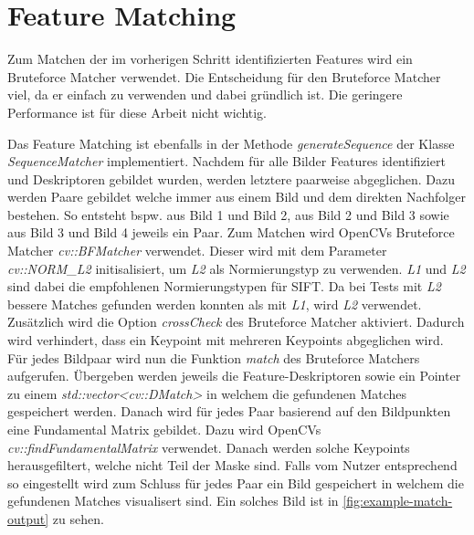 \section{Feature Matching}
Zum Matchen der im vorherigen Schritt identifizierten Features wird ein Bruteforce Matcher verwendet.
Die Entscheidung für den Bruteforce Matcher viel, da er einfach zu verwenden und dabei gründlich ist.
Die geringere Performance ist für diese Arbeit nicht wichtig.

Das Feature Matching ist ebenfalls in der Methode \emph{generateSequence} der Klasse \emph{SequenceMatcher} implementiert.
Nachdem für alle Bilder Features identifiziert und Deskriptoren gebildet wurden, werden letztere paarweise abgeglichen.
Dazu werden Paare gebildet welche immer aus einem Bild und dem direkten Nachfolger bestehen.
So entsteht bspw. aus Bild 1 und Bild 2, aus Bild 2 und Bild 3 sowie aus Bild 3 und Bild 4 jeweils ein Paar.
Zum Matchen wird OpenCVs Bruteforce Matcher \emph{cv::BFMatcher} verwendet.
Dieser wird mit dem Parameter \emph{cv::NORM\_L2} initisalisiert, um \emph{L2} als Normierungstyp zu verwenden.
\emph{L1} und \emph{L2} sind dabei die empfohlenen Normierungstypen für SIFT.
Da bei Tests mit \emph{L2} bessere Matches gefunden werden konnten als mit \emph{L1}, wird \emph{L2} verwendet.
Zusätzlich wird die Option \emph{crossCheck} des Bruteforce Matcher aktiviert.
Dadurch wird verhindert, dass ein Keypoint mit mehreren Keypoints abgeglichen wird.
Für jedes Bildpaar wird nun die Funktion \emph{match} des Bruteforce Matchers aufgerufen.
Übergeben werden jeweils die Feature-Deskriptoren sowie ein Pointer zu einem \emph{std::vector<cv::DMatch>} in welchem die gefundenen Matches gespeichert werden.
Danach wird für jedes Paar basierend auf den Bildpunkten eine Fundamental Matrix gebildet.
Dazu wird OpenCVs \emph{cv::findFundamentalMatrix} verwendet.
Danach werden solche Keypoints herausgefiltert, welche nicht Teil der Maske sind.
Falls vom Nutzer entsprechend so eingestellt wird zum Schluss für jedes Paar ein Bild gespeichert in welchem die gefundenen Matches visualisert sind.
Ein solches Bild ist in \autoref{fig:example-match-output} zu sehen.